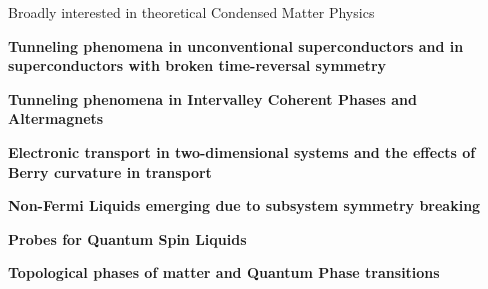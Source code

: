 

\begin{cventries}

  \cventry
    {} %
    {Broadly interested in theoretical Condensed Matter Physics} %
    {} %
    {} %
    {
      \begin{cvitems} %
      	\item {\textbf{Tunneling phenomena in unconventional superconductors and in superconductors with broken time-reversal symmetry}}
      	\item {\textbf{Tunneling phenomena in Intervalley Coherent Phases and Altermagnets}}
      	\item {\textbf{Electronic transport in two-dimensional systems and the effects of Berry curvature in transport}}
      	\item {\textbf{Non-Fermi Liquids emerging due to subsystem symmetry breaking}}
      	\item {\textbf{Probes for Quantum Spin Liquids}}
        \item {\textbf{Topological phases of matter and Quantum Phase transitions}}
      \end{cvitems}
    }

\end{cventries}
